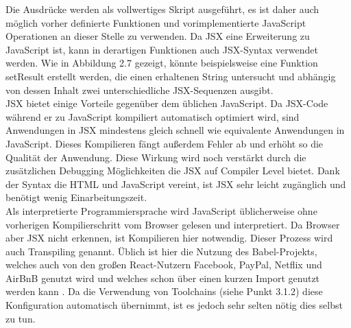 \noindent Die Ausdrücke werden als vollwertiges Skript ausgeführt, es ist daher auch möglich vorher definierte Funktionen und vorimplementierte JavaScript Operationen an dieser Stelle zu verwenden. Da JSX eine Erweiterung zu JavaScript ist, kann in derartigen Funktionen auch JSX-Syntax verwendet werden. Wie in Abbildung 2.7 gezeigt, könnte beispielsweise eine Funktion setResult erstellt werden, die einen erhaltenen String untersucht und abhängig von dessen Inhalt zwei unterschiedliche JSX-Sequenzen ausgibt. \\
JSX bietet einige Vorteile gegenüber dem üblichen JavaScript. Da JSX-Code während er zu JavaScript kompiliert automatisch optimiert wird, sind Anwendungen in JSX mindestens gleich schnell wie equivalente Anwendungen in JavaScript. Dieses Kompilieren fängt außerdem Fehler ab und erhöht so die Qualität der Anwendung. Diese Wirkung wird noch verstärkt durch die zusätzlichen Debugging Möglichkeiten die JSX auf Compiler Level bietet. Dank der Syntax die HTML und JavaScript vereint, ist JSX sehr leicht zugänglich und benötigt wenig Einarbeitungszeit. \\
Als interpretierte Programmiersprache wird JavaScript üblicherweise ohne vorherigen Kompilierschritt vom Browser gelesen und interpretiert. Da Browser aber JSX nicht erkennen, ist Kompilieren hier notwendig. Dieser Prozess wird auch Transpiling genannt. Üblich ist hier die Nutzung des Babel-Projekts, welches auch von den großen React-Nutzern Facebook, PayPal, Netflix und AirBnB genutzt wird und welches schon über einen kurzen Import genutzt werden kann \cite{6}. Da die Verwendung von Toolchains (siehe Punkt 3.1.2) diese Konfiguration automatisch übernimmt, ist es jedoch sehr selten nötig dies selbst zu tun.\\
